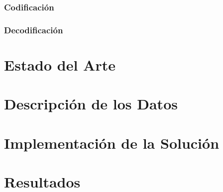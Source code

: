 \subsection{Codificación}

\subsection{Decodificación}

\chapter{Estado del Arte}

\chapter{Descripción de los Datos}

\chapter{Implementación de la Solución}

\chapter{Resultados}
